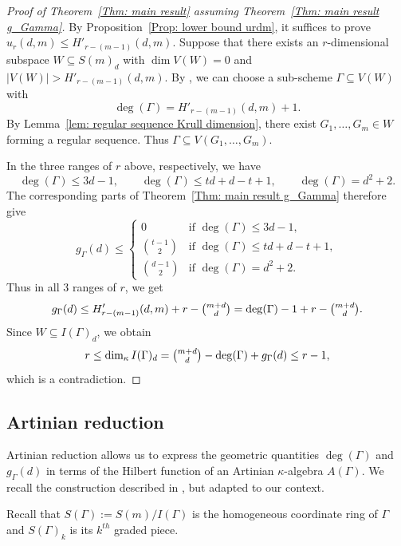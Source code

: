 \documentclass[11pt]{amsart}
\theoremstyle{definition}
\newcommand{\PP}{\mathbb{P}}
\newcommand{\ka}{\kappa}
\begin{document}
\begin{proof}[Proof of Theorem~\ref{Thm: main result} assuming Theorem~\ref{Thm: main result g_Gamma}]
By Proposition~\ref{Prop: lower bound urdm}, it suffices to prove
$u_r(d,m)\leq H'_{r-(m-1)}(d,m)$.
Suppose that there exists an $r$-dimensional subspace
$W\subseteq S(m)_d$ with $\dim V(W)=0$ and
$|V(W)|>H'_{r-(m-1)}(d,m)$. By \cite[Lemma~5.3]{lin2026largest},
we can choose a sub-scheme $\Gamma\subseteq V(W)$ with
\[
\deg(\Gamma)=H'_{r-(m-1)}(d,m)+1.
\]
By Lemma~\ref{lem: regular sequence Krull dimension}, there exist $G_1,\ldots,G_m\in W$
forming a regular sequence.
Thus $\Gamma\subseteq V(G_1,\ldots,G_m)$.

In the three ranges of $r$ above, respectively, we have
\[
\deg(\Gamma)\leq 3d-1,\qquad
\deg(\Gamma)\leq td+d-t+1,\qquad
\deg(\Gamma)=d^2+2.
\]
The corresponding parts of
Theorem~\ref{Thm: main result g_Gamma} therefore give
\[
g_\Gamma(d)\leq
\begin{cases}
0 & \text{if $\deg(\Gamma) \leq 3d-1$},\\
\binom{t-1}{2} & \text{if $\deg(\Gamma) \leq td+d-t+1$},\\
\binom{d-1}{2} & \text{if $\deg(\Gamma)=d^2+2$}.
\end{cases}
\]
Thus in all 3 ranges of $r$, we get
\[
g_{\Gamma}(d)
\leq H'_{r-(m-1)}(d,m)+r-\tbinom{m+d}{d}
= \deg(\Gamma)-1 +r -\tbinom{m+d}{d}.
\]
Since $W\subseteq I(\Gamma)_d$, we obtain 
\[
r\leq\dim_\kappa I(\Gamma)_d
=\tbinom{m+d}{d}-\deg(\Gamma)+g_\Gamma(d)
\leq r-1,
\] 
which is a contradiction.
\end{proof}
\subsection{Artinian reduction}\label{Subsec: Artinian reduction}
Artinian reduction allows us to express the geometric quantities
$\deg(\Gamma)$ and $g_\Gamma(d)$ in terms of the Hilbert function
of an Artinian $\ka$-algebra $A(\Gamma)$.
We recall the construction described in
\cite{eisenbud1996cayley}, but adapted to our context.

Recall that $S(\Gamma):=S(m)/I(\Gamma)$ is the homogeneous coordinate ring of $\Gamma$ and $S(\Gamma)_k$ is its $k^{th}$ graded piece. 

\end{document}
